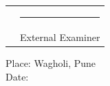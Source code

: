 \vspace{1.2em}

\begin{center}
\begin{tabular}{p{5cm}p{5cm}}
\centering \rule{4cm}{0.4pt}        & \centering \rule{4cm}{0.4pt}        \tabularnewline
\centering \hspace{2em}             & \centering External Examiner          \tabularnewline
\end{tabular}
\end{center}

\vspace{1em}

\noindent Place: Wagholi, Pune\\
Date:

\clearpage

